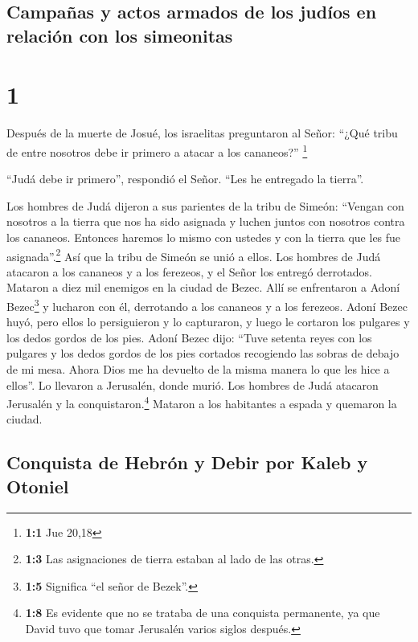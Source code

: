 \hypertarget{campauxf1as-y-actos-armados-de-los-juduxedos-en-relaciuxf3n-con-los-simeonitas}{%
\subsection{Campañas y actos armados de los judíos en relación con los
simeonitas}\label{campauxf1as-y-actos-armados-de-los-juduxedos-en-relaciuxf3n-con-los-simeonitas}}

\hypertarget{section}{%
\section{1}\label{section}}

 Después de la muerte de Josué, los israelitas preguntaron
al Señor: ``¿Qué tribu de entre nosotros debe ir primero a atacar a los
cananeos?'' \footnote{\textbf{1:1} Jue 20,18}

 ``Judá debe ir primero'', respondió el Señor. ``Les he
entregado la tierra''.

 Los hombres de Judá dijeron a sus parientes de la tribu
de Simeón: ``Vengan con nosotros a la tierra que nos ha sido asignada y
luchen juntos con nosotros contra los cananeos. Entonces haremos lo
mismo con ustedes y con la tierra que les fue asignada''.\footnote{\textbf{1:3}
  Las asignaciones de tierra estaban al lado de las otras.} Así que la
tribu de Simeón se unió a ellos.  Los hombres de Judá
atacaron a los cananeos y a los ferezeos, y el Señor los entregó
derrotados. Mataron a diez mil enemigos en la ciudad de Bezec.
 Allí se enfrentaron a Adoní Bezec\footnote{\textbf{1:5}
  Significa ``el señor de Bezek''.} y lucharon con él, derrotando a los
cananeos y a los ferezeos.  Adoní Bezec huyó, pero ellos
lo persiguieron y lo capturaron, y luego le cortaron los pulgares y los
dedos gordos de los pies.  Adoní Bezec dijo: ``Tuve
setenta reyes con los pulgares y los dedos gordos de los pies cortados
recogiendo las sobras de debajo de mi mesa. Ahora Dios me ha devuelto de
la misma manera lo que les hice a ellos''. Lo llevaron a Jerusalén,
donde murió.  Los hombres de Judá atacaron Jerusalén y la
conquistaron.\footnote{\textbf{1:8} Es evidente que no se trataba de una
  conquista permanente, ya que David tuvo que tomar Jerusalén varios
  siglos después.} Mataron a los habitantes a espada y quemaron la
ciudad.

\hypertarget{conquista-de-hebruxf3n-y-debir-por-kaleb-y-otoniel}{%
\subsection{Conquista de Hebrón y Debir por Kaleb y
Otoniel}\label{conquista-de-hebruxf3n-y-debir-por-kaleb-y-otoniel}}

